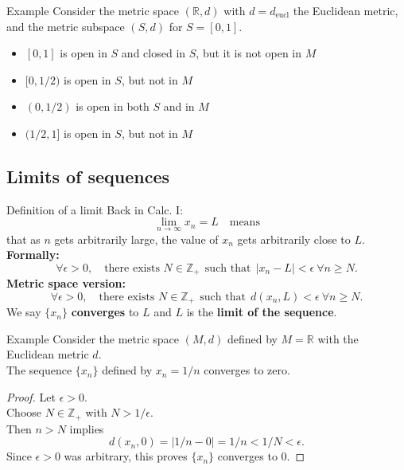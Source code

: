 \documentclass{beamer}
\begin{document}
\begin{frame}{Example}
Consider the metric space $(\mathbb{R},d)$ with $d = d_{\text{eucl}}$ the Euclidean metric, and the metric subspace $(S,d)$ for $S = [0,1]$.
\begin{itemize}
\pause
\item $[0,1]$ is open in $S$ and closed in $S$, but it is not open in $M$
\pause
\item $[0,1/2)$ is open in $S$, but not in $M$
\pause
\item $(0,1/2)$ is open in both $S$ and in $M$
\pause
\item $(1/2,1]$ is open in $S$, but not in $M$
\end{itemize}
\end{frame}

\subsection{Limits of sequences}

\begin{frame}{Definition of a limit}
\pause
Back in Calc. I:
\pause
$$\lim_{n\rightarrow\infty} x_n = L\quad\text{means}$$
\pause
that as $n$ gets arbitrarily large, the value of $x_n$ gets arbitrarily close to $L$.\\
\pause
\textbf{Formally:}
\pause
$$\forall\epsilon > 0,\quad\text{there exists $N\in \mathbb{Z}_+$}\ \ \text{such that}\ \ |x_n-L| < \epsilon\ \forall n\geq N.$$
\pause
\textbf{Metric space version:}
\pause
$$\forall\epsilon > 0,\quad\text{there exists $N\in \mathbb{Z}_+$}\ \ \text{such that}\ \ d(x_n,L) < \epsilon\ \forall n\geq N.$$
\pause
We say $\{x_n\}$ \textbf{converges} to $L$ and $L$ is the \textbf{limit of the sequence}.
\end{frame}

\begin{frame}{Example}
\pause
Consider the metric space $(M,d)$ defined by $M=\mathbb{R}$ with the Euclidean metric $d$.\\
\pause
The sequence $\{x_n\}$ defined by $x_n = 1/n$ converges to zero.\\
\pause
\begin{proof}
\pause
Let $\epsilon > 0$.\\
\pause
Choose $N\in\mathbb{Z}_+$ with $N > 1/\epsilon$.\\
\pause
Then $n>N$ implies
\pause
$$d(x_n,0) = |1/n-0| = 1/n < 1/N < \epsilon.$$
\pause
Since $\epsilon > 0$ was arbitrary, this proves $\{x_n\}$ converges to $0$.
\pause
\end{proof}
\end{frame}
\end{document}
